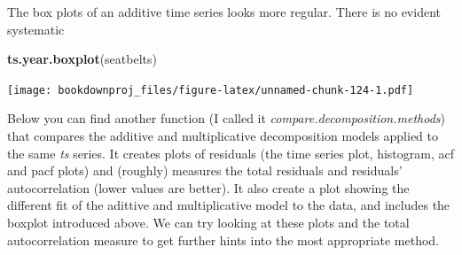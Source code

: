 \documentclass[
]{article}
\newenvironment{Shaded}{\begin{snugshade}}{\end{snugshade}}
\newcommand{\KeywordTok}[1]{\textcolor[rgb]{0.13,0.29,0.53}{\textbf{#1}}}
\newcommand{\NormalTok}[1]{#1}
\begin{document}
The box plots of an additive time series looks more regular. There is no evident systematic

\begin{Shaded}
\begin{Highlighting}[]
\KeywordTok{ts.year.boxplot}\NormalTok{(seatbelts)}
\end{Highlighting}
\end{Shaded}

\texttt{[image: bookdownproj\_files/figure-latex/unnamed-chunk-124-1.pdf]}

Below you can find another function (I called it \emph{compare.decomposition.methods}) that compares the additive and multiplicative decomposition models applied to the same \emph{ts} series. It creates plots of residuals (the time series plot, histogram, acf and pacf plots) and (roughly) measures the total residuals and residuals' autocorrelation (lower values are better). It also create a plot showing the different fit of the adittive and multiplicative model to the data, and includes the boxplot introduced above. We can try looking at these plots and the total autocorrelation measure to get further hints into the most appropriate method.
\end{document}
